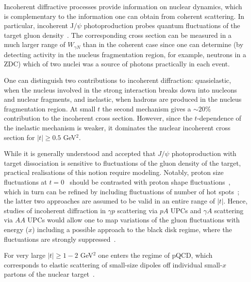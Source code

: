 \documentclass[../report.tex]{subfiles}
\begin{document}

Incoherent diffractive processes provide information on nuclear dynamics,  which is complementary to the 
information one can obtain from 
coherent scattering. In particular, incoherent J$/\psi$ photoproduction  probes quantum fluctuations of the target gluon density~\cite{Frankfurt:2008vi,Mantysaari:2016ykx,Mantysaari:2016jaz,Mantysaari:2017dwh,Cepila:2016uku,Cepila:2017nef}.
The corresponding cross section can be measured in a much larger range of $W_{\gamma N}$ than in the coherent case since one can 
determine  (by detecting activity in the nucleus fragmentation region, for example, neutrons in a ZDC) which of two nuclei was a source of photons practically in each event.

One can distinguish two contributions to incoherent diffraction: 
quasielastic, when the nucleus involved in the strong interaction breaks down into nucleons and nuclear fragments, 
and inelastic, when hadrons are produced in the nucleus fragmentation  region.
At small $t$ the second  mechanism gives a $\sim 20\% $ contribution to the incoherent cross section. However, since the $t$-dependence of the inelastic  mechanism is weaker, it dominates the nuclear incoherent cross section for $|t| \ge 0.5$ GeV$^2$. 

While it is generally understood and accepted that $J/\psi$ photoproduction with target dissociation is sensitive to fluctuations
of the gluon density of the target, practical realisations of this notion require modeling. Notably, 
proton size fluctuations at $t=0$~\cite{Frankfurt:2008vi} should be contrasted with proton shape fluctuations~\cite{Mantysaari:2016ykx,Mantysaari:2016jaz,Mantysaari:2017dwh}, which in turn
can be refined by including fluctuations of number of hot spots~\cite{Cepila:2016uku,Cepila:2017nef}; the latter two approaches 
are assumed to be valid in an entire range of $|t|$.
Hence, studies of incoherent diffraction
in $\gamma p$ scattering via $pA$ UPCs and $\gamma A$ scattering via $AA$ UPCs would allow one to map variations of the gluon fluctuations with energy ($x$) including a possible approach to the black disk regime, where the 
fluctuations are strongly suppressed~\cite{Cepila:2016uku}.

For very large $|t| \ge 1 - 2$ GeV$^2$ one enters the regime of pQCD, which corresponds to elastic scattering of small-size dipoles
off individual small-$x$ partons of the nuclear target~\cite{Frankfurt:2008et,Frankfurt:2008er}.
\end{document}
